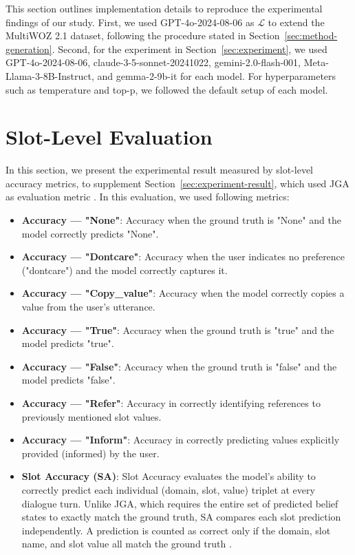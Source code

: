 This section outlines implementation details to reproduce the experimental findings of our study. First, we used GPT-4o-2024-08-06 as $\mathcal{L}$ to extend the MultiWOZ 2.1 dataset, following the procedure stated in Section~\ref{sec:method-generation}. Second, for the experiment in Section~\ref{sec:experiment}, we used GPT-4o-2024-08-06, claude-3-5-sonnet-20241022, gemini-2.0-flash-001, Meta-Llama-3-8B-Instruct, and gemma-2-9b-it for each model. For hyperparameters such as temperature and top-p, we followed the default setup of each model. 

\section{Slot-Level Evaluation}
\label{app:slot-eval}

In this section, we present the experimental result measured by slot-level accuracy metrics, to supplement Section~\ref{sec:experiment-result}, which used JGA as evaluation metric \cite{dey2022towards, wang2022stop, yang2023multi, luo2024zero}. In this evaluation, we used following metrics:

\begin{itemize}
    \item \textbf{Accuracy — "None"}: Accuracy when the ground truth is "None" and the model correctly predicts "None".
    \item \textbf{Accuracy — "Dontcare"}: Accuracy when the user indicates no preference ("dontcare") and the model correctly captures it.
    \item \textbf{Accuracy — "Copy\_value"}: Accuracy when the model correctly copies a value from the user’s utterance.
    \item \textbf{Accuracy — "True"}: Accuracy when the ground truth is "true" and the model predicts "true".
    \item \textbf{Accuracy — "False"}: Accuracy when the ground truth is "false" and the model predicts "false".
    \item \textbf{Accuracy — "Refer"}: Accuracy in correctly identifying references to previously mentioned slot values.
    \item \textbf{Accuracy — "Inform"}: Accuracy in correctly predicting values explicitly provided (informed) by the user.
    \item \textbf{Slot Accuracy (SA)}: Slot Accuracy evaluates the model’s ability to correctly predict each individual (domain, slot, value) triplet at every dialogue turn. Unlike JGA, which requires the entire set of predicted belief states to exactly match the ground truth, SA compares each slot prediction independently. A prediction is counted as correct only if the domain, slot name, and slot value all match the ground truth \cite{wu2019transferable}.
\end{itemize}

